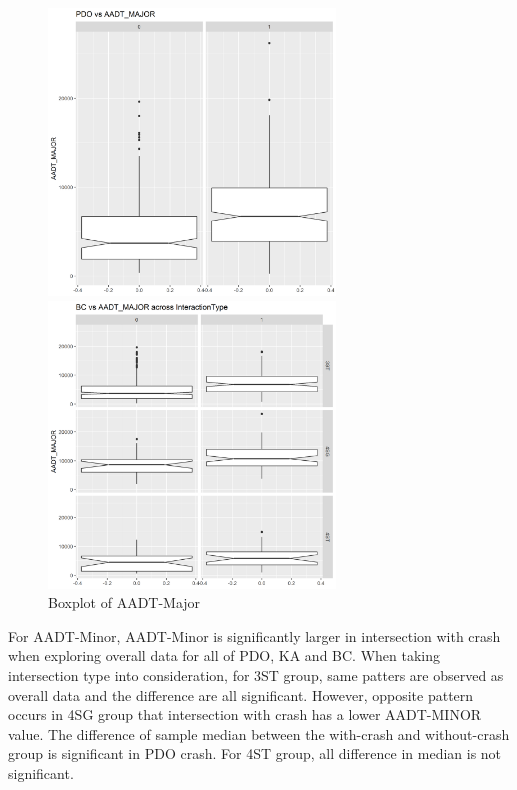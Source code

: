 \documentclass[11pt]{scrartcl} %
\begin{document}
\begin{figure}[H]
\begin{minipage}[t]{0.5\linewidth}
\centering
\includegraphics[width=3in]{image/major_all_pdo.png}
\small
\end{minipage}
\begin{minipage}[t]{0.5\linewidth}
\centering
\includegraphics[width=3in]{image/major_bc.png}
\small
\end{minipage}
\caption{Boxplot of AADT-Major}
\end{figure}

For AADT-Minor, AADT-Minor is significantly larger in intersection with crash when exploring overall data for all of PDO, KA and BC. When taking intersection type into consideration, for 3ST group, same patters are observed as overall data and the difference are all significant. However, opposite pattern occurs in 4SG group that intersection with crash has a lower AADT-MINOR value. The difference of sample median between the with-crash and without-crash group is significant in PDO crash. For 4ST group, all difference in median is not significant.
\end{document}

